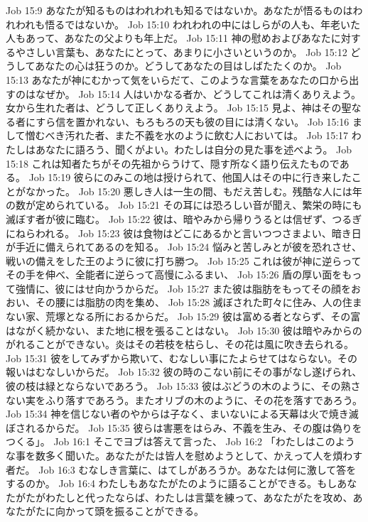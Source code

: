 Job 15:9  あなたが知るものはわれわれも知るではないか。あなたが悟るものはわれわれも悟るではないか。
Job 15:10  われわれの中にはしらがの人も、年老いた人もあって、あなたの父よりも年上だ。
Job 15:11  神の慰めおよびあなたに対するやさしい言葉も、あなたにとって、あまりに小さいというのか。
Job 15:12  どうしてあなたの心は狂うのか。どうしてあなたの目はしばたたくのか。
Job 15:13  あなたが神にむかって気をいらだて、このような言葉をあなたの口から出すのはなぜか。
Job 15:14  人はいかなる者か、どうしてこれは清くありえよう。女から生れた者は、どうして正しくありえよう。
Job 15:15  見よ、神はその聖なる者にすら信を置かれない、もろもろの天も彼の目には清くない。
Job 15:16  まして憎むべき汚れた者、また不義を水のように飲む人においては。
Job 15:17  わたしはあなたに語ろう、聞くがよい。わたしは自分の見た事を述べよう。
Job 15:18  これは知者たちがその先祖からうけて、隠す所なく語り伝えたものである。
Job 15:19  彼らにのみこの地は授けられて、他国人はその中に行き来したことがなかった。
Job 15:20  悪しき人は一生の間、もだえ苦しむ。残酷な人には年の数が定められている。
Job 15:21  その耳には恐ろしい音が聞え、繁栄の時にも滅ぼす者が彼に臨む。
Job 15:22  彼は、暗やみから帰りうるとは信ぜず、つるぎにねらわれる。
Job 15:23  彼は食物はどこにあるかと言いつつさまよい、暗き日が手近に備えられてあるのを知る。
Job 15:24  悩みと苦しみとが彼を恐れさせ、戦いの備えをした王のように彼に打ち勝つ。
Job 15:25  これは彼が神に逆らってその手を伸べ、全能者に逆らって高慢にふるまい、
Job 15:26  盾の厚い面をもって強情に、彼にはせ向かうからだ。
Job 15:27  また彼は脂肪をもってその顔をおおい、その腰には脂肪の肉を集め、
Job 15:28  滅ぼされた町々に住み、人の住まない家、荒塚となる所におるからだ。
Job 15:29  彼は富める者とならず、その富はながく続かない、また地に根を張ることはない。
Job 15:30  彼は暗やみからのがれることができない。炎はその若枝を枯らし、その花は風に吹き去られる。
Job 15:31  彼をしてみずから欺いて、むなしい事にたよらせてはならない。その報いはむなしいからだ。
Job 15:32  彼の時のこない前にその事がなし遂げられ、彼の枝は緑とならないであろう。
Job 15:33  彼はぶどうの木のように、その熟さない実をふり落すであろう。またオリブの木のように、その花を落すであろう。
Job 15:34  神を信じない者のやからは子なく、まいないによる天幕は火で焼き滅ぼされるからだ。
Job 15:35  彼らは害悪をはらみ、不義を生み、その腹は偽りをつくる」。
Job 16:1  そこでヨブは答えて言った、
Job 16:2  「わたしはこのような事を数多く聞いた。あなたがたは皆人を慰めようとして、かえって人を煩わす者だ。
Job 16:3  むなしき言葉に、はてしがあろうか。あなたは何に激して答をするのか。
Job 16:4  わたしもあなたがたのように語ることができる。もしあなたがたがわたしと代ったならば、わたしは言葉を練って、あなたがたを攻め、あなたがたに向かって頭を振ることができる。
